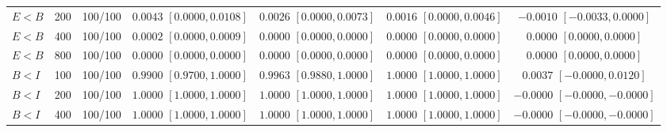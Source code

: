\documentclass[12pt,letterpaper]{article}
\theoremstyle{plain}
\theoremstyle{definition}
\begin{document}
\begin{table}[p]
\begin{adjustbox}{max width=\linewidth}
\begin{tabular}{lrccccc}
$E<B$ & 200 & 100/100 & \shortstack{$0.0043$\\{\scriptsize$[0.0000,0.0108]$}} & \shortstack{$0.0026$\\{\scriptsize$[0.0000,0.0073]$}} & \shortstack{$0.0016$\\{\scriptsize$[0.0000,0.0046]$}} & \shortstack{$-0.0010$\\{\scriptsize$[-0.0033,0.0000]$}}\\
$E<B$ & 400 & 100/100 & \shortstack{$0.0002$\\{\scriptsize$[0.0000,0.0009]$}} & \shortstack{$0.0000$\\{\scriptsize$[0.0000,0.0000]$}} & \shortstack{$0.0000$\\{\scriptsize$[0.0000,0.0000]$}} & \shortstack{$0.0000$\\{\scriptsize$[0.0000,0.0000]$}}\\
$E<B$ & 800 & 100/100 & \shortstack{$0.0000$\\{\scriptsize$[0.0000,0.0000]$}} & \shortstack{$0.0000$\\{\scriptsize$[0.0000,0.0000]$}} & \shortstack{$0.0000$\\{\scriptsize$[0.0000,0.0000]$}} & \shortstack{$0.0000$\\{\scriptsize$[0.0000,0.0000]$}}\\
\addlinespace
$B<I$ & 100 & 100/100 & \shortstack{$0.9900$\\{\scriptsize$[0.9700,1.0000]$}} & \shortstack{$0.9963$\\{\scriptsize$[0.9880,1.0000]$}} & \shortstack{$1.0000$\\{\scriptsize$[1.0000,1.0000]$}} & \shortstack{$0.0037$\\{\scriptsize$[-0.0000,0.0120]$}}\\
$B<I$ & 200 & 100/100 & \shortstack{$1.0000$\\{\scriptsize$[1.0000,1.0000]$}} & \shortstack{$1.0000$\\{\scriptsize$[1.0000,1.0000]$}} & \shortstack{$1.0000$\\{\scriptsize$[1.0000,1.0000]$}} & \shortstack{$-0.0000$\\{\scriptsize$[-0.0000,-0.0000]$}}\\
$B<I$ & 400 & 100/100 & \shortstack{$1.0000$\\{\scriptsize$[1.0000,1.0000]$}} & \shortstack{$1.0000$\\{\scriptsize$[1.0000,1.0000]$}} & \shortstack{$1.0000$\\{\scriptsize$[1.0000,1.0000]$}} & \shortstack{$-0.0000$\\{\scriptsize$[-0.0000,-0.0000]$}}\\

\end{tabular}
\end{adjustbox}
\end{table}
\end{document}
